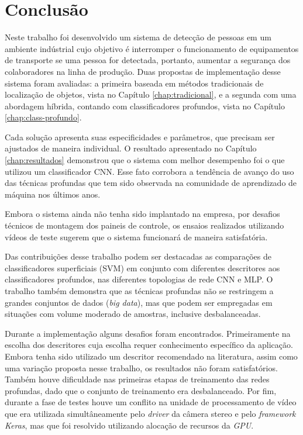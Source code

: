 \chapter{Conclusão} \label{chap:conclusao}

Neste trabalho foi desenvolvido um sistema de detecção de pessoas em um ambiente indústrial cujo objetivo é interromper o funcionamento de equipamentos de transporte se uma pessoa for detectada, portanto, aumentar a segurança dos colaboradores na linha de produção. Duas propostas de implementação desse sistema foram avaliadas: a primeira baseada em métodos tradicionais de localização de objetos, vista no Capítulo \ref{chap:tradicional}, e a segunda com uma abordagem híbrida, contando com classificadores profundos, vista no Capítulo \ref{chap:class-profundo}. 

Cada solução apresenta suas especificidades e parâmetros, que precisam ser ajustados de maneira individual. O resultado apresentado no Capítulo \ref{chap:resultados} demonstrou que o sistema com melhor desempenho foi o que utilizou um classificador CNN. Esse fato corrobora a tendência de avanço do uso das técnicas profundas que tem sido observada na comunidade de aprendizado de máquina nos últimos anos.

Embora o sistema ainda não tenha sido implantado na empresa, por desafios técnicos de montagem dos paineis de controle, os ensaios realizados utilizando vídeos de teste sugerem que o sistema funcionará de maneira satisfatória.

Das contribuições desse trabalho podem ser destacadas as comparações de classificadores superficiais (SVM) em conjunto com diferentes descritores aos classificadores profundos, nas diferentes topologias de rede CNN e MLP. O trabalho também demonstra que as técnicas profundas não se restringem a grandes conjuntos de dados (\textit{big data}), mas que podem ser empregadas em situações com volume moderado de amostras, inclusive desbalanceadas.

Durante a implementação alguns desafios foram encontrados. Primeiramente na escolha dos descritores cuja escolha requer conhecimento específico da aplicação. Embora tenha sido utilizado um descritor recomendado na literatura, assim como uma variação proposta nesse trabalho, os resultados não foram satisfatórios. Também houve dificuldade nas primeiras etapas de treinamento das redes profundas, dado que o conjunto de treinamento era desbalanceado. Por fim, durante a fase de testes houve um conflito na unidade de processamento de vídeo que era utilizada simultâneamente pelo \textit{driver} da câmera stereo e pelo \textit{framework Keras}, mas que foi resolvido utilizando alocação de recursos da \textit{GPU}.

